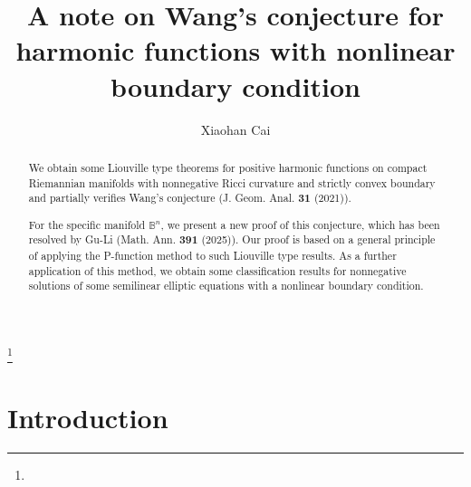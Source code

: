 \documentclass[12pt]{amsart}
\numberwithin{equation}{section}
\numberwithin{lemma}{section}
\numberwithin{proposition}{section}
\numberwithin{corollary}{section}
\numberwithin{remark}{section}
\begin{document}
\title{A note on Wang's conjecture for harmonic functions with nonlinear boundary condition}
\author{Xiaohan Cai}
\address{School of Mathematical Sciences, Shanghai Jiao Tong University}

\thanks{}
\date{}

\begin{abstract}
We obtain some Liouville type theorems for positive harmonic functions on compact Riemannian manifolds with nonnegative Ricci curvature and strictly convex boundary and partially verifies Wang's conjecture (J. Geom. Anal. \textbf{31} (2021)). 

For the specific manifold $\mathbb{B}^n$, we present a new proof of this conjecture, which has been resolved by Gu-Li (Math. Ann. \textbf{391} (2025)). Our proof is based on a general principle of applying the P-function method to such Liouville type results. As a further application of this method, we obtain some classification results for nonnegative solutions of some semilinear elliptic equations  with  a nonlinear boundary condition.
\end{abstract}
\maketitle
\section{Introduction}
\end{document}
